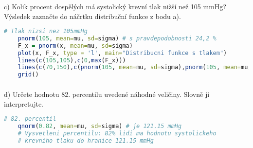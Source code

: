 \documentclass{article}%
\begin{document}
\subsubsection{}
c) Kolik procent dospělých má systolický krevní tlak nižší než 105 mmHg? Výsledek zaznačte do náčrtku distribuční funkce z bodu a).

\begin{lstlisting}[language=R, showstringspaces=false, basicstyle=\small]
    # Tlak nizsi nez 105mmHg
    pnorm(105, mean=mu, sd=sigma) # s pravdepodobnosti 24,2 %
    F_x = pnorm(x, mean=mu, sd=sigma)
    plot(x, F_x, type = 'l', main="Distribucni funkce s tlakem")
    lines(c(105,105),c(0,max(F_x)))
    lines(c(70,150),c(pnorm(105, mean=mu, sd=sigma),pnorm(105, mean=mu, sd=sigma)))
    grid()    
\end{lstlisting}

\subsubsection{}
d) Určete hodnotu 82. percentilu uvedené náhodné veličiny. Slovně ji interpretujte.

\begin{lstlisting}[language=R, showstringspaces=false, basicstyle=\small]
    # 82. percentil
    qnorm(0.82, mean=mu, sd=sigma) # je 121.15 mmHg
    # Vysvetleni percentilu: 82% lidi ma hodnotu systolickeho 
    # krevniho tlaku do hranice 121.15 mmHg
\end{lstlisting}
\end{document}
